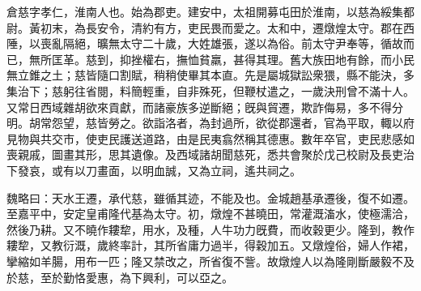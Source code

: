 
\begin{pinyinscope}
倉慈字孝仁，淮南人也。始為郡吏。建安中，太祖開募屯田於淮南，以慈為綏集都尉。黃初末，為長安令，清約有方，吏民畏而愛之。太和中，遷燉煌太守。郡在西陲，以喪亂隔絕，曠無太守二十歲，大姓雄張，遂以為俗。前太守尹奉等，循故而已，無所匡革。慈到，抑挫權右，撫恤貧羸，甚得其理。舊大族田地有餘，而小民無立錐之土；慈皆隨口割賦，稍稍使畢其本直。先是屬城獄訟衆猥，縣不能決，多集治下；慈躬往省閱，料簡輕重，自非殊死，但鞭杖遣之，一歲決刑曾不滿十人。又常日西域雜胡欲來貢獻，而諸豪族多逆斷絕；旣與貿遷，欺詐侮易，多不得分明。胡常怨望，慈皆勞之。欲詣洛者，為封過所，欲從郡還者，官為平取，輙以府見物與共交市，使吏民護送道路，由是民夷翕然稱其德惠。數年卒官，吏民悲感如喪親戚，圖畫其形，思其遺像。及西域諸胡聞慈死，悉共會聚於戊己校尉及長吏治下發哀，或有以刀畫面，以明血誠，又為立祠，遙共祠之。

魏略曰：天水王遷，承代慈，雖循其迹，不能及也。金城趙基承遷後，復不如遷。至嘉平中，安定皇甫隆代基為太守。初，燉煌不甚曉田，常灌溉滀水，使極濡洽，然後乃耕。又不曉作耬犂，用水，及種，人牛功力旣費，而收穀更少。隆到，教作耬犂，又教衍溉，歲終率計，其所省庸力過半，得穀加五。又燉煌俗，婦人作裙，攣縮如羊腸，用布一匹；隆又禁改之，所省復不訾。故燉煌人以為隆剛斷嚴毅不及於慈，至於勤恪愛惠，為下興利，可以亞之。


\end{pinyinscope}
